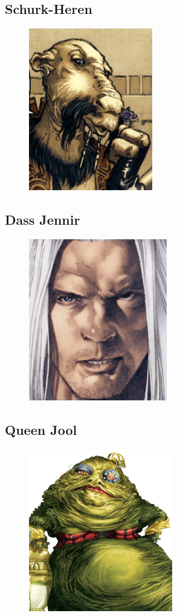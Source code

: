 \newpage
\subsection{Schurk-Heren}\label{sec:schurk-heren}
\begin{figure}[h!]
    \centering
    \includegraphics[height=200pt]{_img/pnjs/schurk-heren.png}
\end{figure}

\newpage
\subsection{Dass Jennir} \label{sec:dass-jennir}
\begin{figure}[h!]
    \centering
    \includegraphics[height=200pt]{_img/pnjs/dass-jennir.png}
\end{figure}

\newpage
\subsection{Queen Jool} \label{sec:queen-jool}
\begin{figure}[h!]
    \centering
    \includegraphics[height=200pt]{_img/pnjs/queen-jool.png}
\end{figure}